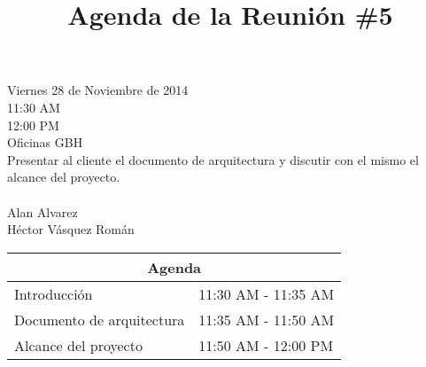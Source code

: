 \documentclass{article}
\begin{document}
\title{\bfseries Agenda de la Reuni\'{o}n \#5}
\date{}
\maketitle

 Viernes 28 de Noviembre de 2014\\
 11:30 AM\\
 12:00 PM\\
 Oficinas GBH\\[0.3in]
 Presentar al cliente el documento de arquitectura y discutir con el mismo el alcance del proyecto.\\[0.3in]
\\
\indent Alan Alvarez\\
\indent H\'{e}ctor V\'{a}squez Rom\'{a}n\\[0.3in]    
\begin{center}
    \begin{tabular}{|p{4cm}|l|}
        \hline
        \multicolumn{2}{|c|}{\bfseries Agenda}\\
        \hline
        Introducci\'{o}n&11:30 AM - 11:35 AM\\
        \hline
        Documento de arquitectura&11:35 AM - 11:50 AM\\
        \hline
        Alcance del proyecto&11:50 AM - 12:00 PM\\
        \hline
    \end{tabular}
\end{center}
\end{document}

